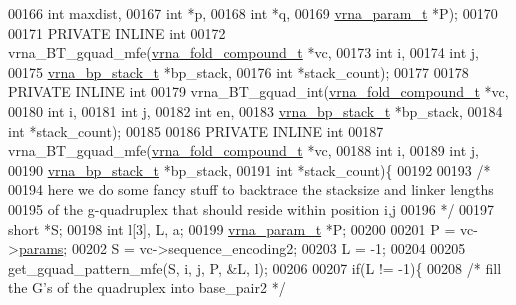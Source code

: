 \begin{DoxyCode}
00166                                               \textcolor{keywordtype}{int} maxdist,
00167                                               \textcolor{keywordtype}{int} *p,
00168                                               \textcolor{keywordtype}{int} *q,
00169                                               \hyperlink{group__energy__parameters_structvrna__param__s}{vrna\_param\_t} *P);
00170 
00171 PRIVATE INLINE \textcolor{keywordtype}{int}
00172 vrna\_BT\_gquad\_mfe(\hyperlink{group__fold__compound_structvrna__fc__s}{vrna\_fold\_compound\_t} *vc,
00173                   \textcolor{keywordtype}{int} i,
00174                   \textcolor{keywordtype}{int} j,
00175                   \hyperlink{group__data__structures_structvrna__bp__stack__s}{vrna\_bp\_stack\_t} *bp\_stack,
00176                   \textcolor{keywordtype}{int} *stack\_count);
00177 
00178 PRIVATE INLINE \textcolor{keywordtype}{int}
00179 vrna\_BT\_gquad\_int(\hyperlink{group__fold__compound_structvrna__fc__s}{vrna\_fold\_compound\_t} *vc,
00180                   \textcolor{keywordtype}{int} i,
00181                   \textcolor{keywordtype}{int} j,
00182                   \textcolor{keywordtype}{int} en,
00183                   \hyperlink{group__data__structures_structvrna__bp__stack__s}{vrna\_bp\_stack\_t} *bp\_stack,
00184                   \textcolor{keywordtype}{int} *stack\_count);
00185 
00186 PRIVATE INLINE \textcolor{keywordtype}{int}
00187 vrna\_BT\_gquad\_mfe(\hyperlink{group__fold__compound_structvrna__fc__s}{vrna\_fold\_compound\_t} *vc,
00188                   \textcolor{keywordtype}{int} i,
00189                   \textcolor{keywordtype}{int} j,
00190                   \hyperlink{group__data__structures_structvrna__bp__stack__s}{vrna\_bp\_stack\_t} *bp\_stack,
00191                   \textcolor{keywordtype}{int} *stack\_count)\{
00192 
00193   \textcolor{comment}{/*}
00194 \textcolor{comment}{    here we do some fancy stuff to backtrace the stacksize and linker lengths}
00195 \textcolor{comment}{    of the g-quadruplex that should reside within position i,j}
00196 \textcolor{comment}{  */}
00197   \textcolor{keywordtype}{short}         *S;
00198   \textcolor{keywordtype}{int}           l[3], L, a;
00199   \hyperlink{group__energy__parameters_structvrna__param__s}{vrna\_param\_t}  *P;
00200 
00201   P = vc->\hyperlink{group__fold__compound_a19b8720c2c5321c1b97c830bd17566ea}{params};
00202   S = vc->sequence\_encoding2;
00203   L = -1;
00204 
00205   get\_gquad\_pattern\_mfe(S, i, j, P, &L, l);
00206 
00207   \textcolor{keywordflow}{if}(L != -1)\{
00208     \textcolor{comment}{/* fill the G's of the quadruplex into base\_pair2 */}

\end{DoxyCode}
